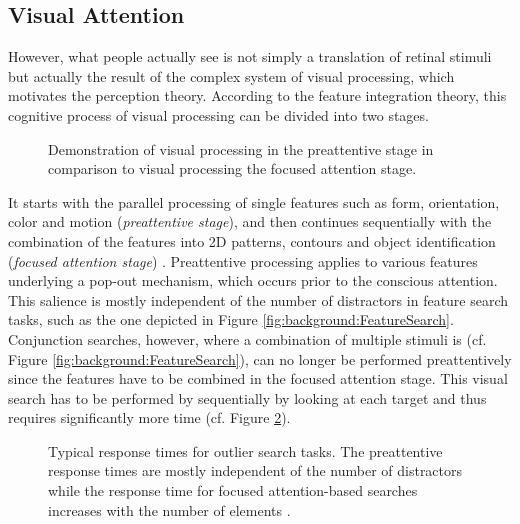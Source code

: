 \subsection{Visual Attention}
However, what people actually see is not simply a translation of retinal stimuli but actually the result of the complex system of visual processing, which motivates the perception theory.
According to the feature integration theory, this cognitive process of visual processing can be divided into two stages.
\begin{figure}[ht]
	\centering
	\qquad
	\caption{
		Demonstration of visual processing in the preattentive stage in comparison to visual processing the focused attention stage.
	}
	\label{fig:background:AttentiveProcessing}
\end{figure}
It starts with the parallel processing of single features such as form, orientation, color and motion (\emph{preattentive stage}), and then continues sequentially with the combination of the features into 2D patterns, contours and object identification (\emph{focused attention stage}) \cite{Treisman:1985:PreattentiveProcessing}.
Preattentive processing applies to various features underlying a pop-out mechanism, which occurs prior to the conscious attention.
This salience is mostly independent of the number of distractors in feature search tasks, such as the one depicted in Figure \ref{fig:background:FeatureSearch}.
Conjunction searches, however, where a combination of multiple stimuli is  (cf. Figure \ref{fig:background:FeatureSearch}), can no longer be performed preattentively since the features have to be combined in the focused attention stage.
This visual search has to be performed by sequentially by looking at each target and thus requires significantly more time (cf. Figure \ref{fig:background:ResponseTimes}).

\begin{figure}[ht]
	\centering
	
	\caption{
		Typical response times for outlier search tasks.
		The preattentive response times are mostly independent of the number of distractors while the response time for focused attention-based searches increases with the number of elements \cite{Ware:2012:IVP:PerceptionForDesign}.
	}
	\label{fig:background:ResponseTimes}
\end{figure}


